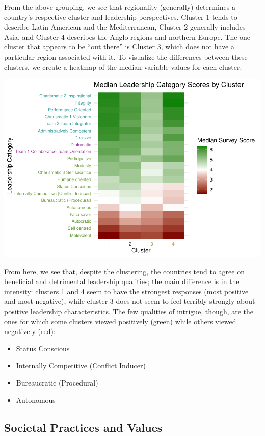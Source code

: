 \documentclass[
]{article}
\providecommand{\tightlist}{%
  \setlength{\itemsep}{0pt}\setlength{\parskip}{0pt}}
\begin{document}
From the above grouping, we see that regionality (generally) determines
a country's respective cluster and leadership perspectives. Cluster 1
tends to describe Latin American and the Mediterranean, Cluster 2
generally includes Asia, and Cluster 4 describes the Anglo regions and
northern Europe. The one cluster that appears to be ``out there'' is
Cluster 3, which does not have a particular region associated with it.
To visualize the differences between these clusters, we create a heatmap
of the median variable values for each cluster:

\begin{center}\includegraphics[width=0.85\linewidth]{final_report_files/figure-latex/cluster_values-1} \end{center}

From here, we see that, despite the clustering, the countries tend to
agree on beneficial and detrimental leadership qualities; the main
difference is in the intensity: clusters 1 and 4 seem to have the
strongest responses (most positive and most negative), while cluster 3
does not seem to feel terribly strongly about positive leadership
characteristics. The few qualities of intrigue, though, are the ones for
which some clusters viewed positively (green) while others viewed
negatively (red):

\begin{itemize}
\tightlist
\item
  Status Conscious
\item
  Internally Competitive (Conflict Inducer)
\item
  Bureaucratic (Procedural)
\item
  Autonomous
\end{itemize}

\hypertarget{societal-practices-and-values}{%
\subsection{Societal Practices and
Values}\label{societal-practices-and-values}}
\end{document}
